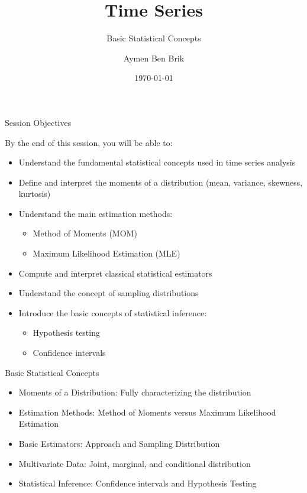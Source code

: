 \documentclass[aspectratio=169]{beamer}
\title{Time Series}
\subtitle{Basic Statistical Concepts}
\author{Aymen Ben Brik}
\institute{
Classe : 1GAMMA
}
\date{\today}
\begin{document}
\begin{frame}
\titlepage
\end{frame}

\begin{frame}{Session Objectives}

By the end of this session, you will be able to:

\begin{itemize}

\item Understand the fundamental statistical concepts used in time series analysis

\item Define and interpret the moments of a distribution (mean, variance, skewness, kurtosis)

\item Understand the main estimation methods:
\begin{itemize}
\item Method of Moments (MOM)
\item Maximum Likelihood Estimation (MLE)
\end{itemize}

\item Compute and interpret classical statistical estimators

\item Understand the concept of sampling distributions

\item Introduce the basic concepts of statistical inference:
\begin{itemize}
\item Hypothesis testing
\item Confidence intervals
\end{itemize}

\end{itemize}

\end{frame}

\begin{frame}{Basic Statistical Concepts}
\begin{itemize}
\item Moments of a Distribution: Fully characterizing the distribution
\item Estimation Methods: Method of Moments versus Maximum Likelihood Estimation
\item Basic Estimators: Approach and Sampling Distribution
\item Multivariate Data: Joint, marginal, and conditional distribution
\item Statistical Inference: Confidence intervals and Hypothesis Testing
\end{itemize}
\end{frame}
\end{document}
